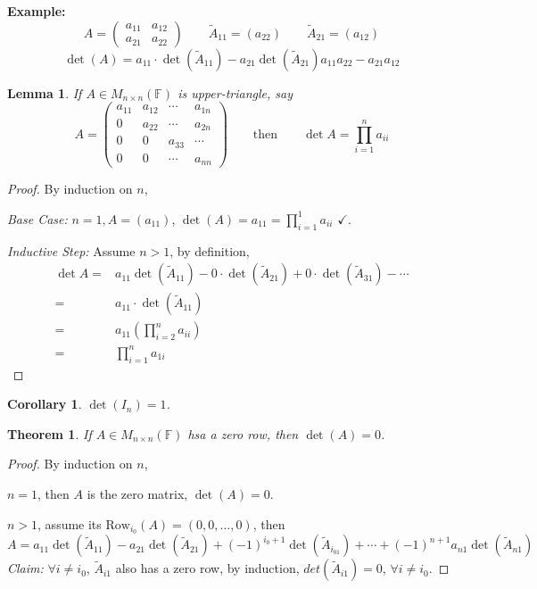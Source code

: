 \documentclass[12pt]{article}
\theoremstyle{plain}
\newtheorem{theorem}{Theorem}[subsection]
\newtheorem{lemma}{Lemma}[subsection]
\newtheorem{corollary}{Corollary}[subsection]
\newcommand{\Row}{\mathrm{Row}}
\newcommand{\mF}{{\mathbb{F}}}
\begin{document}
{\color{Brown}
\textbf{Example:}
\[
	A = 
	\begin{pmatrix}
		a_{11} & a_{12}	\\
		a_{21} & a_{22}	
	\end{pmatrix}
	\qquad 
	\tilde A_{11} = (a_{22}) 
	\qquad 
	\tilde A_{21} = (a_{12})
\]
\[
	\det(A) = a_{11} \cdot \det(\tilde A_{11}) - a_{21} \det(\tilde A_{21})
	a_{11} a_{22} - a_{21} a_{12} 
\]
}

\begin{lemma}
	If $A \in M_{n\times n}(\mF)$ is upper-triangle, say
	\[
		A = 
		\begin{pmatrix}
			a_{11} & a_{12} & \cdots & a_{1n}	\\
			0	   & a_{22} & \cdots & a_{2n}	\\
			0	   & 0		& a_{33} & \cdots	\\
			0	   & 0		& \cdots & a_{nn}
		\end{pmatrix}
		\qquad 
		\text{then}
		\qquad 
		\det A = \prod_{i=1}^n a_{ii}
	\]
\end{lemma}
\begin{proof}
	By induction on $n$, 
	
	\textit{Base Case: } $n=1, A = (a_{11})$, $\det(A) = a_{11} = \prod_{i=1}^1
	a_{ii}$ $\checkmark$. 

	\textit{Inductive Step:} Assume $n > 1$, by definition, 
	\begin{align*}
		\det A =& a_{11} \det (\tilde A_{11}) - 0 \cdot \det(\tilde A_{21})
		+ 0\cdot \det(\tilde A_{31})- \cdots	\\
		=& a_{11} \cdot \det(\tilde A_{11})	\\
		=& a_{11} (\prod_{i=2}^n a_{ii}) \tag{by IH}	\\
		=& \prod_{i=1}^n a_{1i}
	\end{align*}
\end{proof}

\begin{corollary}
	$\det(I_n) = 1$.	\\
\end{corollary}

\begin{theorem}
	If $A \in M_{n\times n}(\mF)$ hsa a zero row, then $\det(A) = 0$.
\end{theorem}
\begin{proof}
	By induction on $n$, 
	
	$n = 1$, then $A$ is the zero matrix, $\det(A) = 0$. 

	$n > 1$, assume its $\Row_{i_0} (A) = (0, 0, \ldots, 0)$, then
	\[
		A = a_{11} \det(\tilde A_{11}) - a_{21} \det(\tilde A_{21})
		+(-1)^{i_0+1}\det(\tilde A_{i_01}) + \cdots + (-1)^{n+1}a_{n1} 
		\det(\tilde A_{n1}) 
	\]
	\textit{Claim:} $\forall i \neq i_0$, $\tilde A_{i1}$ also has a zero row,
	by induction, $det(\tilde A_{i1}) = 0$, $\forall i \neq i_0$.
\end{proof}
\end{document}
